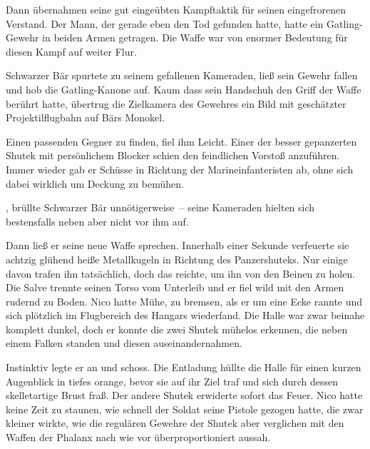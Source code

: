 \par

Dann übernahmen seine gut eingeübten Kampftaktik für seinen eingefrorenen Verstand. Der Mann, der gerade eben den Tod gefunden hatte, hatte ein Gatling-Gewehr in beiden Armen getragen. Die Waffe war von enormer Bedeutung für diesen Kampf auf weiter Flur.

\par

Schwarzer Bär spurtete zu seinem gefallenen Kameraden, ließ sein Gewehr fallen und hob die Gatling-Kanone auf. Kaum dass sein Handschuh den Griff der Waffe berührt hatte, übertrug die Zielkamera des Gewehres ein Bild mit geschätzter Projektilflugbahn auf Bärs Monokel.

\par

Einen passenden Gegner zu finden, fiel ihm Leicht. Einer der besser gepanzerten Shutek mit persönlichem Blocker schien den feindlichen Vorstoß anzuführen. Immer wieder gab er Schüsse in Richtung der Marineinfanteristen ab, ohne sich dabei wirklich um Deckung zu bemühen.

\par

, brüllte Schwarzer Bär unnötigerweise~-- seine Kameraden hielten sich bestensfalls neben aber nicht vor ihm auf.

\par

Dann ließ er seine neue Waffe sprechen. Innerhalb einer Sekunde verfeuerte sie achtzig glühend heiße Metallkugeln in Richtung des Panzershuteks. Nur einige davon trafen ihn tatsächlich, doch das reichte, um ihn von den Beinen zu holen. Die Salve trennte seinen Torso vom Unterleib und er fiel wild mit den Armen rudernd zu Boden.
\ortswechsel
Nico hatte Mühe, zu bremsen, als er um eine Ecke rannte und sich plötzlich im Flugbereich des Hangars wiederfand. Die Halle war zwar beinahe komplett dunkel, doch er konnte die zwei Shutek mühelos erkennen, die neben einem Falken standen und diesen auseinandernahmen.

\par

Instinktiv legte er an und schoss. Die Entladung hüllte die Halle für einen kurzen Augenblick in tiefes orange, bevor sie auf ihr Ziel traf und sich durch dessen skelletartige Brust fraß. Der andere Shutek erwiderte sofort das Feuer. Nico hatte keine Zeit zu staunen, wie schnell der Soldat seine Pistole gezogen hatte, die zwar kleiner wirkte, wie die regulären Gewehre der Shutek aber verglichen mit den Waffen der Phalanx nach wie vor überproportioniert aussah.

